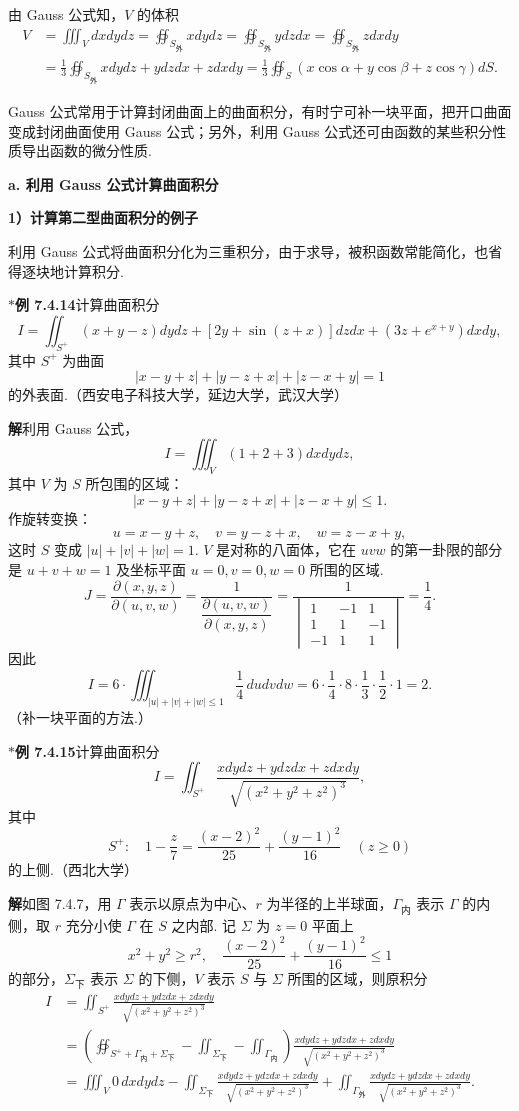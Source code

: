 \documentclass[UTF8, 12pt, fontset=fandol, oneside]{ctexart}
\begin{document}
由 Gauss 公式知，$V$ 的体积
\[
\begin{aligned}
V&=\iiint_Vdxdydz
=\oiint_{S_{\text{外}}}xdydz
=\oiint_{S_{\text{外}}}ydzdx
=\oiint_{S_{\text{外}}}zdxdy\\
&=\frac13\oiint_{S_{\text{外}}}xdydz+ydzdx+zdxdy
=\frac13\oiint_S(x\cos\alpha+y\cos\beta+z\cos\gamma)dS.
\end{aligned}
\]

Gauss 公式常用于计算封闭曲面上的曲面积分，有时宁可补一块平面，把开口曲面变成封闭曲面使用 Gauss 公式；另外，利用 Gauss 公式还可由函数的某些积分性质导出函数的微分性质.

\noindent\textbf{a. 利用 Gauss 公式计算曲面积分}

\noindent\textbf{1）计算第二型曲面积分的例子}

利用 Gauss 公式将曲面积分化为三重积分，由于求导，被积函数常能简化，也省得逐块地计算积分.

\noindent\textbf{$*$例 7.4.14}\quad 计算曲面积分
\[
I=\iint_{S^+}(x+y-z)dydz+[2y+\sin(z+x)]dzdx+(3z+e^{x+y})dxdy,
\]
其中 $S^+$ 为曲面
\[
|x-y+z|+|y-z+x|+|z-x+y|=1
\]
的外表面.（西安电子科技大学，延边大学，武汉大学）

\noindent\textbf{解}\quad 利用 Gauss 公式，
\[
I=\iiint_V(1+2+3)dxdydz,
\]
其中 $V$ 为 $S$ 所包围的区域：
\[
|x-y+z|+|y-z+x|+|z-x+y|\le1.
\]
作旋转变换：
\[
u=x-y+z,\quad v=y-z+x,\quad w=z-x+y,
\]
这时 $S$ 变成 $|u|+|v|+|w|=1$. $V$ 是对称的八面体，它在 $uvw$ 的第一卦限的部分是 $u+v+w=1$ 及坐标平面 $u=0,v=0,w=0$ 所围的区域.
\[
J=\frac{\partial(x,y,z)}{\partial(u,v,w)}
=\frac1{\dfrac{\partial(u,v,w)}{\partial(x,y,z)}}
=\frac1{\begin{vmatrix}
1&-1&1\\
1&1&-1\\
-1&1&1
\end{vmatrix}}
=\frac14.
\]
因此
\[
I=6\cdot\iiint_{|u|+|v|+|w|\le1}\frac14\,dudvdw
=6\cdot\frac14\cdot8\cdot\frac13\cdot\frac12\cdot1=2.
\]
（补一块平面的方法.）

\noindent\textbf{$*$例 7.4.15}\quad 计算曲面积分
\[
I=\iint_{S^+}\frac{xdydz+ydzdx+zdxdy}{\sqrt{(x^2+y^2+z^2)^3}},
\]
其中
\[
S^+:\quad 1-\frac z7=\frac{(x-2)^2}{25}+\frac{(y-1)^2}{16}\quad(z\ge0)
\]
的上侧.（西北大学）

\noindent\textbf{解}\quad 如图 7.4.7，用 $\Gamma$ 表示以原点为中心、$r$ 为半径的上半球面，$\Gamma_{\text{内}}$ 表示 $\Gamma$ 的内侧，取 $r$ 充分小使 $\Gamma$ 在 $S$ 之内部. 记 $\Sigma$ 为 $z=0$ 平面上
\[
x^2+y^2\ge r^2,\quad \frac{(x-2)^2}{25}+\frac{(y-1)^2}{16}\le1
\]
的部分，$\Sigma_{\text{下}}$ 表示 $\Sigma$ 的下侧，$V$ 表示 $S$ 与 $\Sigma$ 所围的区域，则原积分
\[
\begin{aligned}
I&=\iint_{S^+}\frac{xdydz+ydzdx+zdxdy}
{\sqrt{(x^2+y^2+z^2)^3}}\\
&=\left(\oiint_{S^++\Gamma_{\text{内}}+\Sigma_{\text{下}}}
-\iint_{\Sigma_{\text{下}}}-\iint_{\Gamma_{\text{内}}}\right)
\frac{xdydz+ydzdx+zdxdy}{\sqrt{(x^2+y^2+z^2)^3}}\\
&=\iiint_V0\,dxdydz
-\iint_{\Sigma_{\text{下}}}\frac{xdydz+ydzdx+zdxdy}
{\sqrt{(x^2+y^2+z^2)^3}}
+\iint_{\Gamma_{\text{外}}}\frac{xdydz+ydzdx+zdxdy}
{\sqrt{(x^2+y^2+z^2)^3}}.
\end{aligned}
\]
\end{document}
